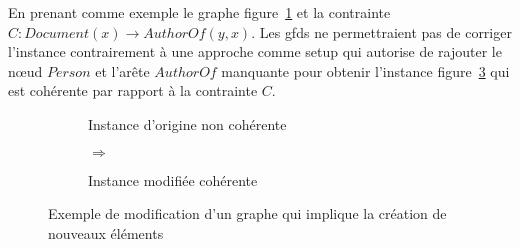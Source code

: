 \begin{example}
      En prenant comme exemple le graphe figure~\ref{fig:update:discussion:g1} et la contrainte $C: Document(x) \to AuthorOf(y, x)$.
      Les \glspl{gfd} ne permettraient pas de corriger l'instance contrairement à une approche comme \gls{setup} qui autorise de rajouter le nœud $Person$ et l'arête $AuthorOf$ manquante pour obtenir l'instance figure~\ref{fig:update:discussion:g2} qui est cohérente par rapport à la contrainte $C$.

      \begin{figure}[htb]
            \centering
            \begin{subfigure}[c]{.35\textwidth}
                  \centering
                  \caption{Instance d'origine non cohérente}
                  \label{fig:update:discussion:g1}
            \end{subfigure}
            \hfill
            \begin{subfigure}[c]{.1\textwidth}
                \centering
                \huge{$\Longrightarrow$}
            \end{subfigure}
            \hfill
            \begin{subfigure}[c]{.45\textwidth}
                  \centering
                  \caption{Instance modifiée cohérente}
                  \label{fig:update:discussion:g2}
            \end{subfigure}
            \caption[Exemple de modification d'un graphe]{Exemple de modification d'un graphe qui implique la création de nouveaux éléments}
      \end{figure}
\end{example}

